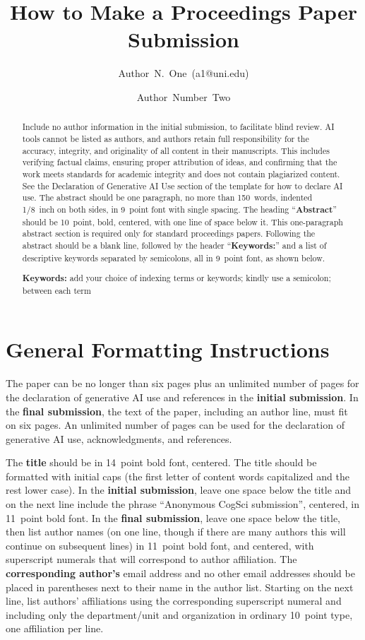 \documentclass[10pt,letterpaper]{article}
\title{How to Make a Proceedings Paper Submission}
\author[1]{\mbox{Author N. One (a1@uni.edu)}}
\author[2]{\mbox{Author Number Two}}
\affil[1]{Department of Hypothetical Sciences, University of Illustrations}
\affil[2]{Department of Example Studies, University of Demonstrations}
\begin{document}
\maketitle

\begin{abstract}
Include no author information in the initial submission, to facilitate blind review. AI tools cannot
be listed as authors, and authors retain full responsibility for the accuracy, integrity, and
originality of all content in their manuscripts. This includes verifying factual claims, ensuring
proper attribution of ideas, and confirming that the work meets standards for academic integrity and
does not contain plagiarized content. See the Declaration of Generative AI Use section of the
template for how to declare AI use. The abstract should be one paragraph, no more than 150~words,
indented 1/8~inch on both sides, in 9~point font with single spacing. The heading
``\textbf{Abstract}'' should be 10~point, bold, centered, with one line of space below it. This
one-paragraph abstract section is required only for standard proceedings papers. Following the
abstract should be a blank line, followed by the header ``\textbf{Keywords:}'' and a list of
descriptive keywords separated by semicolons, all in 9~point font, as shown below.

\textbf{Keywords:}
add your choice of indexing terms or keywords;
kindly use a semicolon;
between each term
\end{abstract}

\section{General Formatting Instructions}

The paper can be no longer than six pages plus an unlimited number of pages for the declaration of
generative AI use and references in the \textbf{initial submission}. In the \textbf{final
  submission}, the text of the paper, including an author line, must fit on six pages. An unlimited
number of pages can be used for the declaration of generative AI use, acknowledgments, and
references.

The \textbf{title} should be in 14~point bold font, centered. The title should be formatted with
initial caps (the first letter of content words capitalized and the rest lower case). In the
\textbf{initial submission}, leave one space below the title and on the next line include the
phrase ``Anonymous CogSci submission'', centered, in 11~point bold font. In the \textbf{final
  submission}, leave one space below the title, then list author names (on one line, though if there
are many authors this will continue on subsequent lines) in 11~point bold font, and centered, with
superscript numerals that will correspond to author affiliation. The \textbf{corresponding
  author's} email address and no other email addresses should be placed in parentheses next to their
name in the author list. Starting on the next line, list authors' affiliations using the
corresponding superscript numeral and including only the department/unit and organization in
ordinary 10~point type, one affiliation per line.
\end{document}
